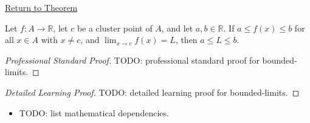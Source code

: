 \newpage
{}
\label{prf:bounded-limits}

\begin{remark*}[Return]
\hyperref[thm:bounded-limits]{Return to Theorem}
\end{remark*}

\begin{theorem*}
Let $f : A \to \mathbb{R}$, let $c$ be a cluster point of $A$, and
let $a, b \in \mathbb{R}$. If $a \leq f(x) \leq b$ for all $x \in A$
with $x \neq c$, and $\lim_{x\to c}f(x)=L$, then
$a \leq L \leq b$.

\smallskip\noindent
\end{theorem*}

\begin{proof}[Professional Standard Proof]
\LRAProofBodyStart
TODO: professional standard proof for bounded-limits.
\end{proof}

\begin{proof}[Detailed Learning Proof]
\LRAProofBodyStart
TODO: detailed learning proof for bounded-limits.
\end{proof}

\begin{remark*}
\end{remark*}

\begin{dependencies}
\begin{itemize}
  \item TODO: list mathematical dependencies.
\end{itemize}
\end{dependencies}

\clearpage
